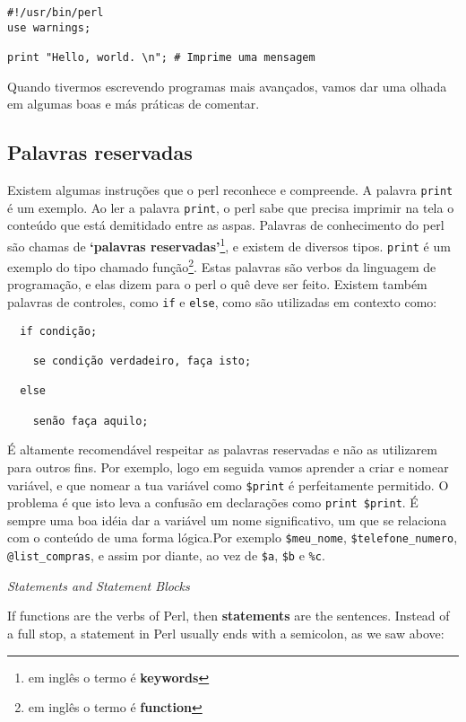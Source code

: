 \documentclass[a4paper,12pt,twoside]{book}
\begin{document}
\begin{lstlisting}
#!/usr/bin/perl
use warnings;

print "Hello, world. \n"; # Imprime uma mensagem
\end{lstlisting}

\noindent Quando tivermos escrevendo programas mais avançados, vamos 
dar uma olhada em algumas boas e más práticas de comentar.\medskip

\subsection{Palavras reservadas}

\noindent Existem algumas instruções que o perl reconhece e compreende.
A palavra \texttt{print} é um exemplo. Ao ler a palavra \texttt{print}, 
o perl sabe que precisa imprimir na tela o conteúdo que está demitidado 
entre as aspas. Palavras de conhecimento do perl são chamas de 
\textbf{`palavras reservadas'}\footnote{em inglês o termo é \textbf{keywords}}, 
e existem de diversos tipos. \texttt{print} é um exemplo do tipo chamado 
função\footnote{em inglês o termo é \textbf{function}}. Estas palavras 
são verbos da linguagem de programação, e elas dizem para o perl o quê 
deve ser feito. Existem também palavras de controles, como \texttt{if} 
e \texttt{else}, como são utilizadas em contexto como:\medskip

{\scriptsize
\begin{verbatim}
  if condição;

    se condição verdadeiro, faça isto;

  else

    senão faça aquilo;
\end{verbatim}
}

\noindent É altamente recomendável respeitar as palavras reservadas 
e não as utilizarem para outros fins. Por exemplo, logo em seguida vamos 
aprender a criar e nomear variável, e que nomear a tua variável como 
\texttt{\$print} é perfeitamente permitido. O problema é que isto leva 
a confusão em declarações como \texttt{print \$print}. É sempre uma boa 
idéia dar a variável um nome significativo, um que se relaciona com o 
conteúdo de uma forma lógica.Por exemplo \texttt{\$meu\_nome}, \texttt{\$telefone\_numero}, 
\texttt{@list\_compras}, e assim por diante, ao vez de \texttt{\$a}, \texttt{\$b} 
e \texttt{\%c}.\medskip

\noindent \textit{Statements and Statement Blocks}

\noindent If functions are the verbs of Perl, then \textbf{statements }are 
the sentences. Instead of a full stop, a statement in Perl usually ends 
with a semicolon, as we saw above:\medskip
\end{document}
